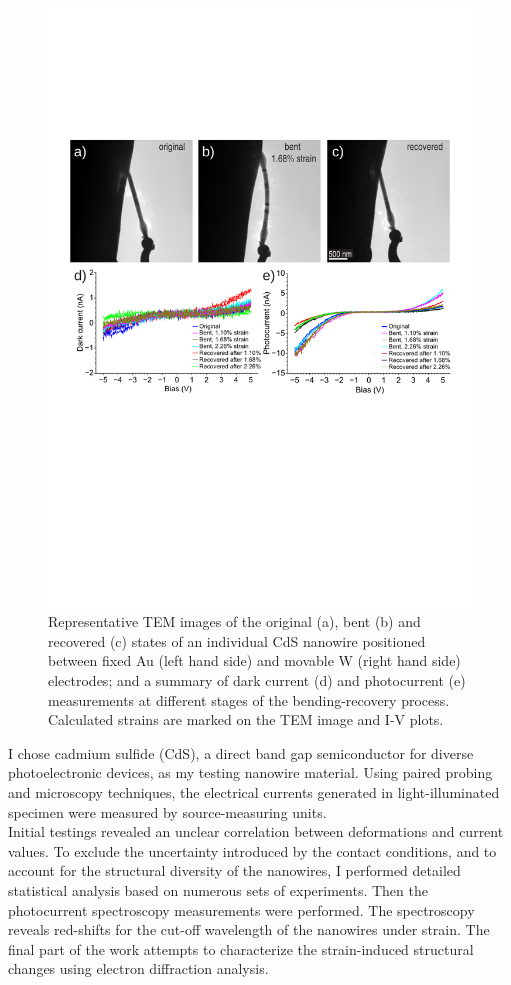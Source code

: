 \begin{figure} [t] 
\centering
\includegraphics[width=\textwidth]{figures/figure6_2}
\caption[Deformation and I-V measurements]
{Representative TEM images of the original (a), bent (b) and recovered (c) states of an individual CdS nanowire positioned between fixed Au (left hand side) and movable W (right hand side) electrodes; and a summary of dark current (d) and photocurrent (e) measurements at different stages of the bending-recovery process. Calculated strains are marked on the TEM image and I-V plots. 
\label{fig:6_2}}
\end{figure}

I chose cadmium sulfide (CdS), a direct band gap semiconductor for diverse photoelectronic devices, as my testing nanowire material.\cite{Xing2015} 
Using paired probing and microscopy techniques, the electrical currents generated in light-illuminated specimen were measured by source-measuring units. \\
Initial testings revealed an unclear correlation between deformations and current values. 
To exclude the uncertainty introduced by the contact conditions, and to account for the structural diversity of the nanowires, I performed detailed statistical analysis based on numerous sets of experiments. 
Then the photocurrent spectroscopy measurements were performed. The spectroscopy reveals red-shifts for the cut-off wavelength of the nanowires under strain. 
The final part of the work attempts to characterize the strain-induced structural changes using electron diffraction analysis. 
\vfill

